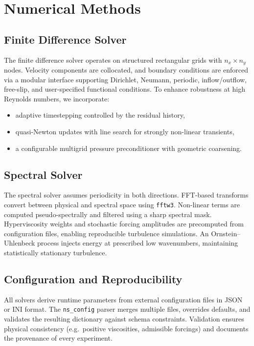 \documentclass[final,onefignum,onetabnum]{siamonline220329}
\begin{document}
\section{Numerical Methods}
\subsection{Finite Difference Solver}
The finite difference solver operates on structured rectangular grids with $n_x \times n_y$ nodes.
Velocity components are collocated, and boundary conditions are enforced via a modular interface supporting Dirichlet, Neumann, periodic, inflow/outflow, free-slip, and user-specified functional conditions.
To enhance robustness at high Reynolds numbers, we incorporate:
\begin{itemize}
  \item adaptive timestepping controlled by the residual history,
  \item quasi-Newton updates with line search for strongly non-linear transients,
  \item a configurable multigrid pressure preconditioner with geometric coarsening.
\end{itemize}

\subsection{Spectral Solver}
The spectral solver assumes periodicity in both directions.
FFT-based transforms convert between physical and spectral space using \texttt{fftw3}.
Non-linear terms are computed pseudo-spectrally and filtered using a sharp spectral mask.
Hyperviscosity weights and stochastic forcing amplitudes are precomputed from configuration files, enabling reproducible turbulence simulations.
An Ornstein--Uhlenbeck process injects energy at prescribed low wavenumbers, maintaining statistically stationary turbulence.

\subsection{Configuration and Reproducibility}
All solvers derive runtime parameters from external configuration files in JSON or INI format.
The \texttt{ns\_config} parser merges multiple files, overrides defaults, and validates the resulting dictionary against schema constraints.
Validation ensures physical consistency (e.g.\ positive viscosities, admissible forcings) and documents the provenance of every experiment.
\end{document}
